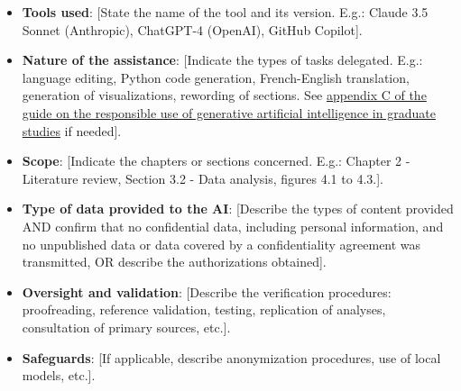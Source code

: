\begin{itemize}
    \item \textbf{Tools used}: [State the name of the tool and its version. E.g.: Claude 3.5 Sonnet (Anthropic), ChatGPT-4 (OpenAI), GitHub Copilot].
    \item \textbf{Nature of the assistance}: [Indicate the types of tasks delegated. E.g.: language editing, Python code generation, French-English translation, generation of visualizations, rewording of sections. See \href{https://libguides.biblio.usherbrooke.ca/ld.php?content_id=37838948}{appendix C of the guide on the responsible use of generative artificial intelligence in graduate studies} if needed].
    \item \textbf{Scope}: [Indicate the chapters or sections concerned. E.g.: Chapter 2 - Literature review, Section 3.2 - Data analysis, figures 4.1 to 4.3.].
    \item \textbf{Type of data provided to the AI}: [Describe the types of content provided AND confirm that no confidential data, including personal information, and no unpublished data or data covered by a confidentiality agreement was transmitted, OR describe the authorizations obtained].
    \item \textbf{Oversight and validation}: [Describe the verification procedures: proofreading, reference validation, testing, replication of analyses, consultation of primary sources, etc.].
    \item \textbf{Safeguards}: [If applicable, describe anonymization procedures, use of local models, etc.].
\end{itemize}
